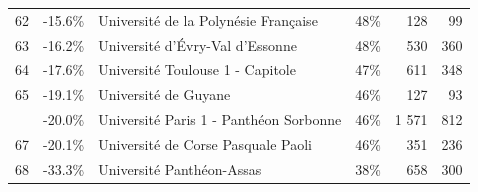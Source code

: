 \documentclass[12pt,french,]{article}
\begin{document}
\begin{longtable}{rrlrrr}
62 & -15.6\% & Université de la Polynésie Française & 48\% & 128 & 99\\
\rowcolor{gray!6}  63 & -16.2\% & Université d'Évry-Val d'Essonne & 48\% & 530 & 360\\
64 & -17.6\% & Université Toulouse 1 - Capitole & 47\% & 611 & 348\\
\rowcolor{gray!6}  65 & -19.1\% & Université de Guyane & 46\% & 127 & 93\\
\addlinespace
66 & -20.0\% & Université Paris 1 - Panthéon Sorbonne & 46\% & 1 571 & 812\\
\rowcolor{gray!6}  67 & -20.1\% & Université de Corse Pasquale Paoli & 46\% & 351 & 236\\
68 & -33.3\% & Université Panthéon-Assas & 38\% & 658 & 300\\*
\end{longtable}
\end{document}

